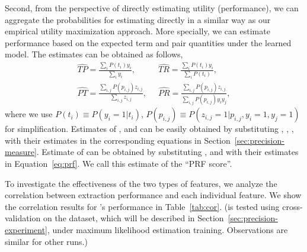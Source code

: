 Second, from the perspective of directly estimating utility (performance), we can aggregate the probabilities for estimating \PRF directly in a similar way as our empirical utility maximization approach. More specially, we can estimate \PRF performance based on the expected term and pair quantities under the learned model. The estimates can be obtained as follows,
\begin{equation}
\label{eq:mest} %
\begin{split}
\widehat{T\!P}=\frac{\sum_i P(t_i)y_i}{\sum_i y_i}, &\;\; \widehat{T\!R}=\frac{\sum_i P(t_i)y_i}{\sum_i P(t_i)},\\ 
\widehat{P\!T}=\frac{\sum_{i,j} P(p_{i,j})z_{i,j}}{\sum_{i,j} z_{i,j}},&\;\; \widehat{P\!R}=\frac{\sum_{i,j} P(p_{i,j})z_{i,j}}{\sum_{i,j} P(p_{i,j})y_iy_j},
\end{split}
\end{equation}
where we use $P(t_i)\equiv P(y_i\!=\!1|t_i)$, $P(p_{i,j})\equiv P(z_{i,j}\!=\!1|p_{i,j}, y_i\!=\!1,y_j\!=\!1)$ for simplification. Estimates of \TF, \PF and can be easily obtained by substituting \TP, \TR, \PP, \PR with their estimates in the corresponding equations in Section~\ref{sec:precision-measure}. Estimate of \PRF can be obtained by substituting \TP, \TR and \PF with their estimates in Equation~\ref{eq:prf}. We call this estimate of \PRF the ``PRF score''.

To investigate the effectiveness of the two types of features, we analyze the correlation between extraction performance and each individual feature. We show the correlation results for \QFI's  performance in Table~\ref{tab:cor}. (\QFI is tested using cross-validation on the \DQF dataset, which will be described in Section~\ref{sec:precision-experiment}, under maximum likelihood estimation training. Observations are similar for other runs.) 

